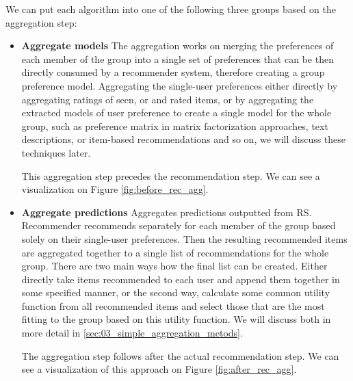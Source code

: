 We can put each algorithm into one of the following three groups based on the aggregation step:
\begin{itemize}
    \item \textbf{Aggregate models} \newline
    The aggregation works on merging the preferences of each member of the group into a single set of preferences that can be then directly consumed by a recommender system, therefore creating a group preference model. Aggregating the single-user preferences either directly by aggregating ratings of seen, or and rated items, or by aggregating the extracted models of user preference to create a single model for the whole group, such as preference matrix in matrix factorization approaches, text descriptions, or item-based recommendations and so on, we will discuss these techniques later.
    
    
    This aggregation step precedes the recommendation step. We can see a visualization on Figure \ref{fig:before_rec_agg}.
    
    
    \item \textbf{Aggregate predictions} \newline
     Aggregates predictions outputted from RS. Recommender recommends separately for each member of the group based solely on their single-user preferences. Then the resulting recommended items are aggregated together to a single list of recommendations for the whole group. There are two main ways how the final list can be created. Either directly take items recommended to each user and append them together in some specified manner, or the second way, calculate some common utility function from all recommended items and select those that are the most fitting to the group based on this utility function. We will discuss both in more detail in \ref{sec:03_simple_aggregation_metods}.
     
     The aggregation step follows after the actual recommendation step. We can see a visualization of this approach on Figure \ref{fig:after_rec_agg}.
     

\end{itemize}
